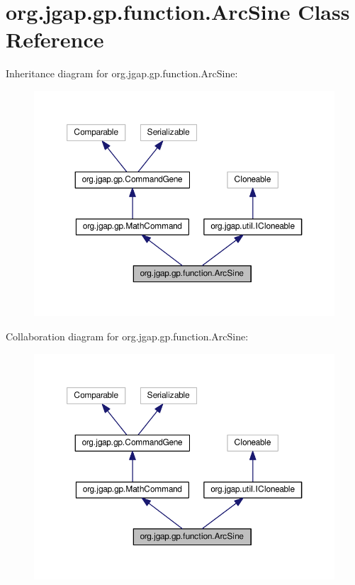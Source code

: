 \hypertarget{classorg_1_1jgap_1_1gp_1_1function_1_1_arc_sine}{\section{org.\-jgap.\-gp.\-function.\-Arc\-Sine Class Reference}
\label{classorg_1_1jgap_1_1gp_1_1function_1_1_arc_sine}
}


Inheritance diagram for org.\-jgap.\-gp.\-function.\-Arc\-Sine\-:
\nopagebreak
\begin{figure}[H]
\begin{center}
\leavevmode
\includegraphics[width=350pt]{classorg_1_1jgap_1_1gp_1_1function_1_1_arc_sine__inherit__graph}
\end{center}
\end{figure}


Collaboration diagram for org.\-jgap.\-gp.\-function.\-Arc\-Sine\-:
\nopagebreak
\begin{figure}[H]
\begin{center}
\leavevmode
\includegraphics[width=350pt]{classorg_1_1jgap_1_1gp_1_1function_1_1_arc_sine__coll__graph}
\end{center}
\end{figure}
